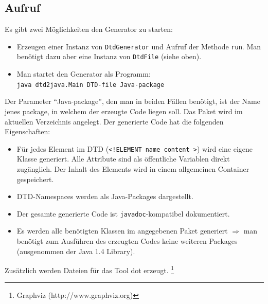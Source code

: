 \documentclass [a4paper,11pt] {scrartcl}
\begin{document}
\subsection{Aufruf}
Es gibt zwei M{\"o}glichkeiten den Generator zu starten:
\begin{itemize}
\item Erzeugen einer Instanz von \texttt{DtdGenerator} und Aufruf der Methode \texttt{run}.
    Man ben{\"o}tigt dazu aber eine Instanz von \texttt{DtdFile} (siehe oben).
\item Man startet den Generator als Programm:\\
    \texttt{java dtd2java.Main DTD-file Java-package}
\end{itemize}
Der Parameter "`Java-package"', den man in beiden F{\"a}llen ben{\"o}tigt, ist der Name
jenes package, in welchem der erzeugte Code liegen soll. Das Paket wird im aktuellen
Verzeichnis angelegt. Der generierte Code hat die folgenden Eigenschaften:
\begin{itemize}
\item F{\"u}r jedes Element im DTD (\texttt{<!ELEMENT name content >})
    wird eine eigene Klasse generiert. Alle Attribute sind als {\"o}ffentliche Variablen
    direkt zug{\"a}nglich. Der Inhalt des Elements wird in einem allgemeinen Container gespeichert.
\item DTD-Namespaces werden als Java-Packages dargestellt.
\item Der gesamte generierte Code ist \texttt{javadoc}-kompatibel dokumentiert.
\item Es werden alle ben{\"o}tigten Klassen im angegebenen Paket generiert
    $\Rightarrow$ man ben{\"o}tigt zum Ausf{\"u}hren des erzeugten Codes keine
    weiteren Packages (ausgenommen der Java 1.4 Library).
\end{itemize}
Zus{\"a}tzlich werden Dateien f{\"u}r das Tool \textsf{dot} erzeugt.
\footnote{Graphviz (http://www.graphviz.org)}
\newpage
\end{document}
